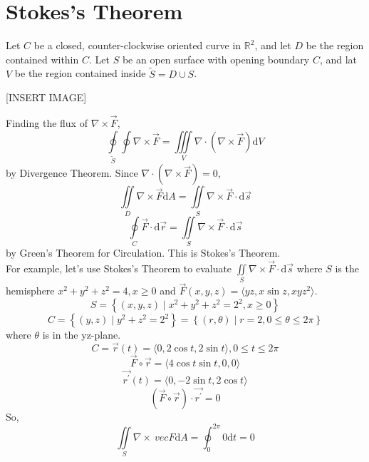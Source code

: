 \section{Stokes's Theorem}
\noindent
Let $C$ be a closed, counter-clockwise oriented curve in $\mathbb{R}^2$, and let $D$ be the region contained within $C$. Let $S$ be an open surface with opening boundary $C$, and lat $V$ be the region contained inside $\tilde{S} = D \cup S$.

[INSERT IMAGE]

\noindent
Finding the flux of $\nabla \times \vec{F}$,
\begin{equation*}
	\oint\limits_{\tilde{S}}\oint{\nabla \times \vec{F}} = \iiint\limits_{V}{\nabla \cdot (\nabla \times \vec{F})\mathrm{d}V}
\end{equation*}
by Divergence Theorem. Since $\nabla \cdot (\nabla \times \vec{F}) = 0$, 
\begin{equation*}
	\iint\limits_{D}{\nabla \times \vec{F}\mathrm{d}A} = \iint\limits_{S}{\nabla \times \vec{F} \cdot \mathrm{d}\vec{s}}	
\end{equation*}
\begin{equation*}
	\oint\limits_{C}{\vec{F} \cdot \mathrm{d}\vec{r}} = \iint\limits_{S}{\nabla \times \vec{F} \cdot \mathrm{d}\vec{s}}
\end{equation*}
by Green's Theorem for Circulation. This is Stokes's Theorem.\\

\noindent
For example, let's use Stokes's Theorem to evaluate $\iint\limits_{S}{\nabla \times \vec{F} \cdot \mathrm{d}\vec{s}}$ where $S$ is the hemisphere $x^2 + y^2 + z^2 = 4, x \geq 0$ and $\vec{F}(x,y,z) = \langle yz, x\sin{z}, xyz^2 \rangle$.
\begin{equation*}
	S = \left\{(x,y,z) \mid x^2 + y^2 + z^2 = 2^2, x \geq 0 \right\}	
\end{equation*}
\begin{equation*}
	C = \left\{(y,z) \mid y^2 + z^2 = 2^2 \right\} = \left\{(r,\theta) \mid r = 2, 0 \leq \theta \leq 2\pi \right\}
\end{equation*}
where $\theta$ is in the yz-plane.
\begin{equation*}
	C = \vec{r}(t) = \langle 0, 2\cos{t}, 2\sin{t} \rangle, 0 \leq t \leq 2\pi
\end{equation*}
\begin{equation*}
	\vec{F}\circ\vec{r} = \langle 4\cos{t}\sin{t}, 0, 0 \rangle	
\end{equation*}
\begin{equation*}
	\vec{r^\prime}(t) = \langle 0, -2\sin{t}, 2\cos{t}\rangle
\end{equation*}
\begin{equation*}
	\left(\vec{F}\circ\vec{r}\right) \cdot \vec{r^\prime} = 0	
\end{equation*}
So, 
\begin{equation*}
	\iint\limits_{S}{\nabla \times\ vec{F}\mathrm{d}A} = \oint_{0}^{2\pi}{0\mathrm{d}t} = 0
\end{equation*}

